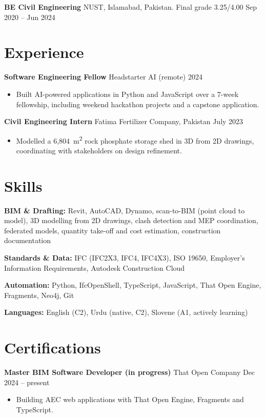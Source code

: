 \documentclass[a4paper,10.5pt]{article}
\newcommand{\datefill}{\dotfill}
\newcommand{\entry}[3]{\vspace{2.5pt}\noindent\textbf{#1} \textbar{} #2 \datefill{} #3\par\vspace{0.5pt}}
\newcommand{\skillrow}[2]{\noindent\textbf{#1:} #2\par\vspace{1pt}}
\begin{document}
\entry{BE Civil Engineering}{NUST, Islamabad, Pakistan. Final grade 3.25/4.00}{Sep 2020 -- Jun 2024}

\section{Experience}
\entry{Software Engineering Fellow}{Headstarter AI (remote)}{2024}
\begin{itemize}
  \item Built AI-powered applications in Python and JavaScript over a 7-week fellowship,
        including weekend hackathon projects and a capstone application.
\end{itemize}

\entry{Civil Engineering Intern}{Fatima Fertilizer Company, Pakistan}{July 2023}
\begin{itemize}
  \item Modelled a 6,804~m\textsuperscript{2} rock phosphate storage shed in 3D from
        2D drawings, coordinating with stakeholders on design refinement.
\end{itemize}

\section{Skills}

\skillrow{BIM \& Drafting}{Revit, AutoCAD, Dynamo, scan-to-BIM (point cloud to model), 3D modelling from 2D drawings, clash detection and MEP coordination, federated models, quantity take-off and cost estimation, construction documentation}
\skillrow{Standards \& Data}{IFC (IFC2X3, IFC4, IFC4X3), ISO 19650, Employer's Information Requirements, Autodesk Construction Cloud}
\skillrow{Automation}{Python, IfcOpenShell, TypeScript, JavaScript, That Open Engine, Fragments, Neo4j, Git}

\skillrow{Languages}{English (C2), Urdu (native, C2), Slovene (A1, actively learning)}

\section{Certifications}
\entry{Master BIM Software Developer (in progress)}{That Open Company}{Dec 2024 -- present}
\begin{itemize}
  \item Building AEC web applications with That Open Engine, Fragments and TypeScript.
\end{itemize}
\end{document}
